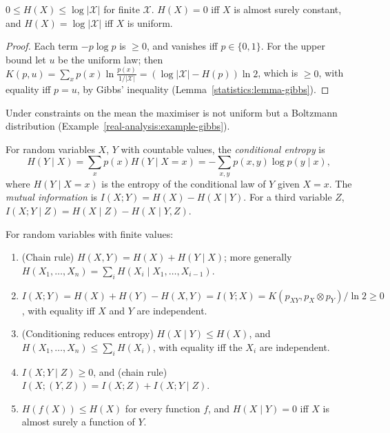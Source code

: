 \begin{proposition}\label{information-theory:proposition-entropy-bounds}
$0 \leq H(X) \leq \log|\mathcal{X}|$ for finite $\mathcal{X}$. $H(X) = 0$ iff $X$ is almost surely constant, and $H(X) = \log|\mathcal{X}|$ iff $X$ is uniform.
\end{proposition}

\begin{proof}
Each term $-p\log p$ is $\geq 0$, and vanishes iff $p \in \{0, 1\}$. For the upper bound let $u$ be the uniform law; then
$K(p, u) = \sum_xp(x)\ln\frac{p(x)}{1/|\mathcal{X}|} = (\log|\mathcal{X}| - H(p))\ln 2$, which is $\geq 0$, with equality iff $p = u$, by Gibbs' inequality (Lemma~\ref{statistics:lemma-gibbs}).
\end{proof}

Under constraints on the mean the maximiser is not uniform but a Boltzmann distribution (Example~\ref{real-analysis:example-gibbs}).

\begin{definition}\label{information-theory:definition-conditional-entropy}
For random variables $X$, $Y$ with countable values, the \emph{conditional entropy} is
\[
H(Y \mid X) = \sum_xp(x)H(Y \mid X = x) = -\sum_{x,y}p(x, y)\log p(y \mid x),
\]
where $H(Y \mid X = x)$ is the entropy of the conditional law of $Y$ given $X = x$. The \emph{mutual information} is $I(X; Y) = H(X) - H(X \mid Y)$. For a third variable $Z$, $I(X; Y \mid Z) = H(X \mid Z) - H(X \mid Y, Z)$.
\end{definition}

\begin{proposition}\label{information-theory:proposition-entropy-rules}
For random variables with finite values:
\begin{enumerate}
\item (Chain rule) $H(X, Y) = H(X) + H(Y \mid X)$; more generally $H(X_1, \ldots, X_n) = \sum_iH(X_i \mid X_1, \ldots, X_{i-1})$.
\item $I(X; Y) = H(X) + H(Y) - H(X, Y) = I(Y; X) = K(p_{XY}, p_X \otimes p_Y)/\ln 2 \geq 0$, with equality iff $X$ and $Y$ are independent.
\item (Conditioning reduces entropy) $H(X \mid Y) \leq H(X)$, and $H(X_1, \ldots, X_n) \leq \sum_iH(X_i)$, with equality iff the $X_i$ are independent.
\item $I(X; Y \mid Z) \geq 0$, and (chain rule) $I(X; (Y, Z)) = I(X; Z) + I(X; Y \mid Z)$.
\item $H(f(X)) \leq H(X)$ for every function $f$, and $H(X \mid Y) = 0$ iff $X$ is almost surely a function of $Y$.
\end{enumerate}
\end{proposition}

